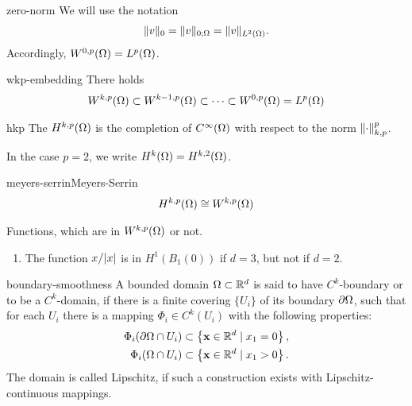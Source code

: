 \begin{Notation}{zero-norm}
  We will use the notation
  \begin{gather*}
    \lVert v\rVert_0 = \lVert v\rVert_{0;\Omega} = \lVert v\rVert_{L^2(\Omega)}.
  \end{gather*}
  Accordingly, $W^{0,p}(\Omega) = L^p(\Omega)$.
\end{Notation}

\begin{Corollary}{wkp-embedding}
  There holds
  \begin{gather}
    W^{k,p}(\Omega) \subset W^{k-1,p}(\Omega) \subset \dots \subset
    W^{0,p}(\Omega) = L^{p}(\Omega)
  \end{gather}
\end{Corollary}

\begin{Definition}{hkp}
  The  $H^{k,p}(\Omega)$ is the completion of
  $C^\infty(\Omega)$ with respect to the norm $\lVert\cdot\rVert_{k,p}^p$.

  In the case $p=2$, we write $H^k(\Omega) = H^{k,2}(\Omega)$.
\end{Definition}

\begin{Theorem*}{meyers-serrin}{Meyers-Serrin}
  \begin{gather*}
    H^{k,p}(\Omega)\cong W^{k,p}(\Omega)
  \end{gather*}
\end{Theorem*}

\begin{example}
  Functions, which are in $W^{k,p}(\Omega)$ or not.
  \begin{enumerate}
  \item The function $x/\lvert x\rvert$ is in $H^1(B_1(0))$ if $d=3$, but not
    if $d=2$.
  \end{enumerate}
\end{example}

\begin{Definition}{boundary-smoothness}
  A bounded domain $\Omega\subset\mathbb R^d$ is said to have $C^k$-boundary
  or to be a $C^k$-domain, if there is a finite covering $\{U_i\}$ of
  its boundary $\partial\Omega$, such that for each $U_i$ there is
  a mapping $\Phi_i \in C^k(U_i)$ with the following properties:
  \begin{gather}
    \begin{split}
      \Phi_i(\partial\Omega \cap U_i)
      &\subset \left\{ \mathbf x\in\mathbb R^d \mid x_1 = 0 \right\},\\
      \Phi_i(\Omega \cap U_i)
      &\subset \left\{ \mathbf x\in\mathbb R^d \mid x_1 > 0 \right\}.      
    \end{split}
  \end{gather}
  The domain is called Lipschitz, if such a construction exists with
  Lipschitz-continuous mappings.
\end{Definition}


